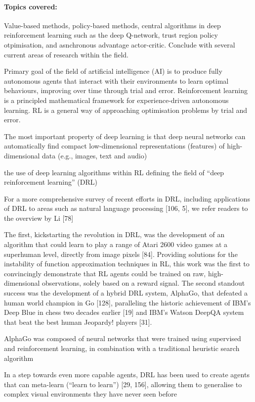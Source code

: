 \paragraph*{Topics covered: }Value-based methods, policy-based methods, central algorithms in deep reinforcement learning such as the deep Q-network, trust region policy otpimisation, and asnchronous advantage actor-critic. Conclude with several current areas of research within the field. 

Primary goal of the field of artificial intelligence (AI) is to produce fully autonomous agents that interact with their environments to learn optimal behaviours, improving over time through trial and error. Reinforcement learning is a principled mathematical framework for experience-driven autonomous learning. RL is a general way of approaching optimisation problems by trial and error.

The most important property of deep learning is that deep neural networks can automatically find compact low-dimensional representations (features) of high-dimensional data (e.g., images, text and audio) 


the use of
deep learning algorithms within RL defining the field of
“deep reinforcement learning” (DRL)

For a more comprehensive survey of recent efforts in
DRL, including applications of DRL to areas such as natural
language processing [106, 5], we refer readers to the overview
by Li [78]


The first, kickstarting the revolution in DRL,
was the development of an algorithm that could learn to play
a range of Atari 2600 video games at a superhuman level,
directly from image pixels [84]. Providing solutions for the
instability of function approximation techniques in RL, this
work was the first to convincingly demonstrate that RL agents
could be trained on raw, high-dimensional observations, solely
based on a reward signal. The second standout success was
the development of a hybrid DRL system, AlphaGo, that
defeated a human world champion in Go [128], paralleling the
historic achievement of IBM’s Deep Blue in chess two decades
earlier [19] and IBM’s Watson DeepQA system that beat the
best human Jeopardy! players [31].


AlphaGo
was composed of neural networks that were trained using
supervised and reinforcement learning, in combination with
a traditional heuristic search algorithm


In a step towards even more capable agents,
DRL has been used to create agents that can meta-learn (“learn
to learn”) [29, 156], allowing them to generalise to complex
visual environments they have never seen before

